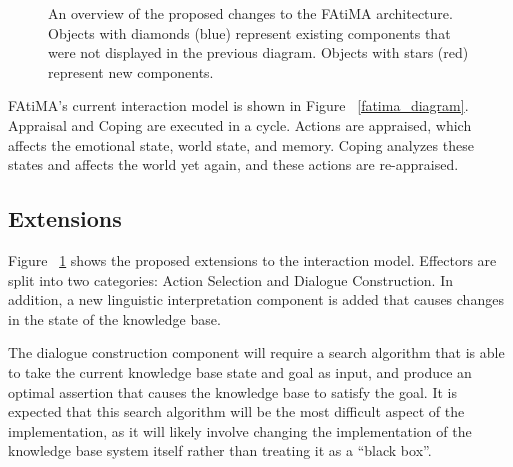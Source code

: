 \documentclass{article}
\begin{document}
\begin{figure}[htbp!]
  \caption{An overview of the proposed changes to the FAtiMA architecture.  Objects with diamonds (blue)
  represent existing components that were not displayed in the previous diagram.  Objects with stars (red)
  represent new components.}
  \label{fatima_diagram_modifications}
\end{figure}

FAtiMA's current interaction model is shown in Figure ~\ref{fatima_diagram}.
Appraisal and Coping are executed in a cycle.  Actions are appraised, which
affects the emotional state, world state, and memory.  Coping analyzes these
states and affects the world yet again, and these actions are re-appraised.

\subsection{Extensions}

Figure ~\ref{fatima_diagram_modifications} shows the proposed extensions
to the interaction model.  Effectors are split into two categories: Action
Selection and Dialogue Construction.  In addition, a new linguistic interpretation
component is added that causes changes in the state of the knowledge base.

The dialogue construction component will require a search algorithm that is
able to take the current knowledge base state and goal as input, and produce
an optimal assertion that causes the knowledge base to satisfy the goal.  It
is expected that this search algorithm will be the most difficult aspect
of the implementation, as it will likely involve changing the implementation
of the knowledge base system itself rather than treating it as a ``black box''.
\end{document}

